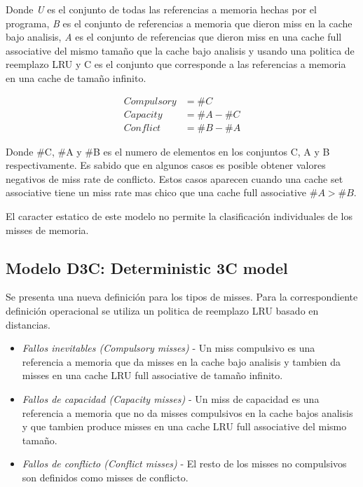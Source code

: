 \documentclass{article}
\begin{document}
Donde \textit{U} es el conjunto de todas las referencias a memoria hechas por el programa, \textit{B} es el conjunto de referencias a memoria que dieron miss en la cache bajo analisis, 
\textit{A} es el conjunto de referencias que dieron miss en una cache full associative del mismo tamaño que la cache bajo analisis y usando una politica de reemplazo LRU y C es el conjunto que corresponde a las referencias a memoria en una cache de tamaño infinito.

\begin{align*}
    Compulsory &= \#C \\
    Capacity &= \#A - \#C \\
    Conflict &= \#B - \#A
\end{align*} 

Donde \#C, \#A y \#B es el numero de elementos en los conjuntos C, A y B respectivamente. 
Es sabido que en algunos casos es posible obtener valores negativos de miss rate de conflicto. Estos casos aparecen cuando una cache set associative tiene un miss rate mas chico que una cache full associative \(\#A > \#B\). 

El caracter estatico de este modelo no permite la clasificación individuales de los misses de memoria.

\newpage
\subsection{Modelo D3C: Deterministic 3C model}
Se presenta una nueva definición para los tipos de misses. Para la correspondiente definición operacional se utiliza un politica de reemplazo LRU basado en distancias.

\begin{itemize} 
    \item \textit{Fallos inevitables (Compulsory misses)} - Un miss compulsivo es una referencia a memoria que da misses en la cache bajo analisis y tambien da misses en una cache LRU full associative de tamaño infinito.
    \item \textit{Fallos de capacidad (Capacity misses)} - Un miss de capacidad es una referencia a memoria que no da misses compulsivos en la cache bajos analisis y que tambien produce misses en una cache LRU full associative del mismo tamaño.
    \item \textit{Fallos de conflicto (Conflict misses)} - El resto de los misses no compulsivos son definidos como misses de conflicto.
\end{itemize}
\end{document}
